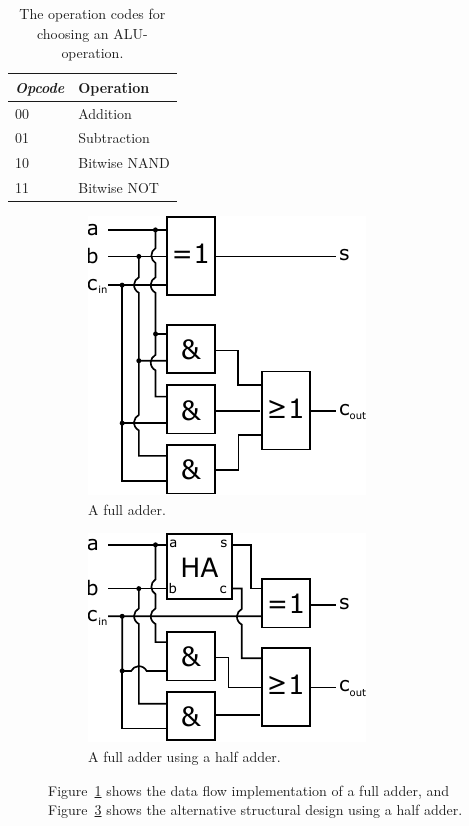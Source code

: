 \documentclass[a4,11pt]{article}
\begin{document}
\begin{table}   
	\centering
	\small
	\def\arraystretch{1.1}              
	\begin{tabular}{|l|l|}
		\hline
		{\it Opcode}    & {\bf Operation} \\ \hline
		00              & Addition        \\ 
		01              & Subtraction     \\
		10              & Bitwise NAND    \\ 
		11              & Bitwise NOT     \\ \hline
	\end{tabular}
	\caption{The operation codes for choosing an ALU-operation.}
	\label{tab:op}
\end{table}

\begin{figure}[h!]
	\centering
 	\begin{subfigure}{.5\textwidth}
		\centering
		\includegraphics[height=.3\textheight]{Figurer/fa}
		\caption{A full adder.}
		\label{fig:fa} 
	\end{subfigure}%
	\begin{subfigure}{.5\textwidth}
		\centering
		\includegraphics[height=.3\textheight]{Figurer/fa2}
		\caption{A full adder using a half adder.}
		\label{fig:fa2} 
  	\end{subfigure}
	\caption{Figure~\ref{fig:fa} shows the data flow implementation of a full adder,
		and Figure~\ref{fig:fa2} shows the alternative structural design using a half adder.}
\end{figure}
\end{document}
